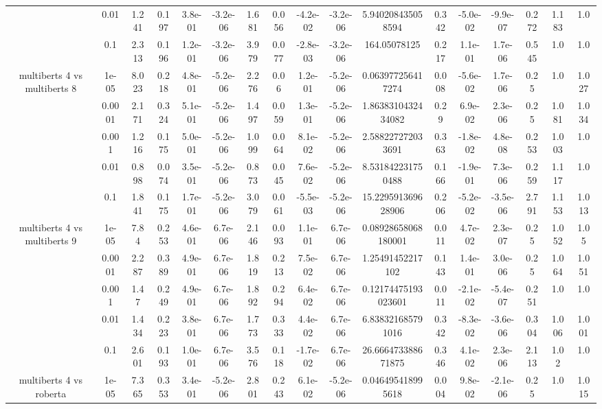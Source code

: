 \begin{tabular}{|c|c|c|c|c|c|c|c|c|c|c|c|c|c|c|c|c|}
 & 0.01 & 1.241 & 0.197 & 3.8e-01 & -3.2e-06 & 1.681 & 0.056 & -4.2e-02 & -3.2e-06 & 5.940208435058594 & 0.342 & -5.0e-02 & -9.9e-07 & 0.272 & 1.183 & 1.0 \\
 & 0.1 & 2.313 & 0.196 & 1.2e-01 & -3.2e-06 & 3.979 & 0.077 & -2.8e-03 & -3.2e-06 & 164.05078125 & 0.217 & 1.1e-01 & 1.7e-06 & 0.545 & 1.0 & 1.0 \\
\hline
\multirow{5}{*}{multiberts 4 vs multiberts 8} & 1e-05 & 8.023 & 0.218 & 4.8e-01 & -5.2e-06 & 2.276 & 0.06 & 1.2e-01 & -5.2e-06 & 0.063977256417274 & 0.008 & -5.6e-02 & 1.7e-06 & 0.25 & 1.0 & 1.027 \\
 & 0.0001 & 2.171 & 0.324 & 5.1e-01 & -5.2e-06 & 1.497 & 0.059 & 1.3e-01 & -5.2e-06 & 1.8638310432434082 & 0.29 & 6.9e-02 & 2.3e-06 & 0.25 & 1.081 & 1.034 \\
 & 0.001 & 1.216 & 0.175 & 5.0e-01 & -5.2e-06 & 1.099 & 0.064 & 8.1e-02 & -5.2e-06 & 2.588227272033691 & 0.363 & -1.8e-02 & 4.8e-08 & 0.253 & 1.003 & 1.0 \\
 & 0.01 & 0.898 & 0.074 & 3.5e-01 & -5.2e-06 & 0.873 & 0.045 & 7.6e-02 & -5.2e-06 & 8.531842231750488 & 0.166 & -1.9e-01 & 7.3e-06 & 0.259 & 1.117 & 1.0 \\
 & 0.1 & 1.841 & 0.175 & 1.7e-01 & -5.2e-06 & 3.079 & 0.061 & -5.5e-03 & -5.2e-06 & 15.229591369628906 & 0.206 & -5.2e-02 & -3.5e-06 & 2.791 & 1.153 & 1.013 \\
\hline
\multirow{5}{*}{multiberts 4 vs multiberts 9} & 1e-05 & 7.84 & 0.253 & 4.6e-01 & 6.7e-06 & 2.146 & 0.093 & 1.1e-01 & 6.7e-06 & 0.08928658068180001 & 0.011 & 4.7e-02 & 2.3e-07 & 0.25 & 1.052 & 1.05 \\
 & 0.0001 & 2.287 & 0.389 & 4.9e-01 & 6.7e-06 & 1.819 & 0.213 & 7.5e-02 & 6.7e-06 & 1.25491452217102 & 0.143 & 1.4e-01 & 3.0e-06 & 0.25 & 1.064 & 1.051 \\
 & 0.001 & 1.47 & 0.249 & 4.9e-01 & 6.7e-06 & 1.892 & 0.294 & 6.4e-02 & 6.7e-06 & 0.12174475193023601 & 0.011 & -2.1e-02 & -5.4e-07 & 0.251 & 1.0 & 1.0 \\
 & 0.01 & 1.434 & 0.223 & 3.8e-01 & 6.7e-06 & 1.773 & 0.333 & 4.4e-02 & 6.7e-06 & 6.838321685791016 & 0.342 & -8.3e-02 & -3.6e-06 & 0.304 & 1.006 & 1.001 \\
 & 0.1 & 2.601 & 0.193 & 1.0e-01 & 6.7e-06 & 3.576 & 0.118 & -1.7e-02 & 6.7e-06 & 26.666473388671875 & 0.346 & 4.1e-02 & 2.3e-06 & 2.113 & 1.02 & 1.0 \\
\hline
\multirow{5}{*}{multiberts 4 vs roberta } & 1e-05 & 7.365 & 0.353 & 3.4e-01 & -5.2e-06 & 2.801 & 0.243 & 6.1e-02 & -5.2e-06 & 0.046495418995618 & 0.004 & 9.8e-02 & -2.1e-06 & 0.25 & 1.0 & 1.015 \\

\end{tabular}
